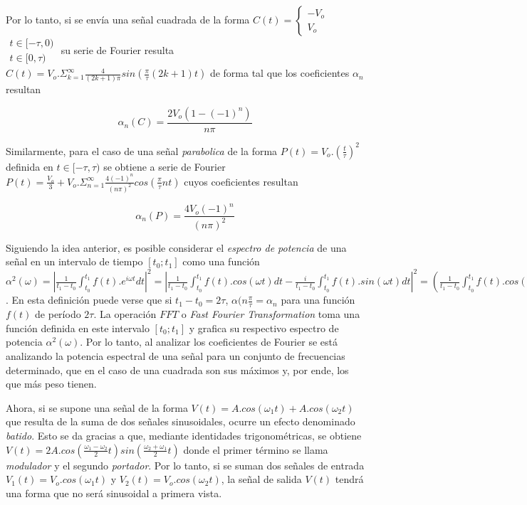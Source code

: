 \documentclass[11pt,a4paper]{article}
\begin{document}
Por lo tanto, si se envía una señal cuadrada de la forma $C(t)=
\left\{\begin{matrix}
-V_o \\ V_o
\end{matrix}\right.$
$\begin{matrix}
t\in[-\tau,0)\\ t\in[0,\tau)
\end{matrix}$
su serie de Fourier resulta $C(t) = V_o.\Sigma_{k=1}^{\infty} \frac{4}{(2k+1)\pi}sin(\frac{\pi}{\tau}(2k+1)t)$ de forma tal que los coeficientes $\alpha_n$ resultan

\begin{equation}
\alpha_n(C) = \frac{2V_o(1-(-1)^n)}{n\pi}
\label{eq:coef_cuad}
\end{equation}

Similarmente, para el caso de una señal \textit{parabolica} de la forma $P(t)=V_o.(\frac{t}{\tau})^2$ definida en $t\in[-\tau,\tau)$ se obtiene a serie de Fourier $P(t) = \frac{V_o}{3} + V_o.\Sigma_{n=1}^{\infty} \frac{4(-1)^n}{(n\pi)^2}cos(\frac{\pi}{\tau}nt)$ cuyos coeficientes resultan

\begin{equation}
\alpha_n(P) = \frac{4V_o(-1)^n}{(n\pi)^2}
\label{eq:coef_parab}
\end{equation}

Siguiendo la idea anterior, es posible considerar el \textit{espectro de potencia} de una señal en un intervalo de tiempo $[t_0;t_1]$ como una función $\alpha^2(\omega) = |\frac{1}{t_1-t_0}\int_{t_0}^{t_1} f(t).e^{i\omega t}dt|^2= |\frac{1}{t_1-t_0}\int_{t_0}^{t_1} f(t).cos(\omega t)dt - \frac{i}{t_1-t_0}\int_{t_0}^{t_1} f(t).sin(\omega t)dt|^2 = (\frac{1}{t_1-t_0}\int_{t_0}^{t_1} f(t).cos(\omega t)dt)^2+(\frac{1}{t_1-t_0}\int_{t_0}^{t_1} f(t).sin(\omega t)dt)^2$. En esta definición puede verse que si $t_1-t_0=2\tau$, $\alpha(n\frac{\pi}{\tau} = \alpha_n$ para una función $f(t)$ de período $2\tau$. La operación $FFT$ o \textit{Fast Fourier Transformation} toma una función definida en este intervalo $[t_0;t_1]$ y grafica su respectivo espectro de potencia $\alpha^2(\omega)$. Por lo tanto, al analizar los coeficientes de Fourier se está analizando la potencia espectral de una señal para un conjunto de frecuencias determinado, que en el caso de una cuadrada son sus máximos y, por ende, los que más peso tienen. 


Ahora, si se supone una señal de la forma $V(t) = A.cos(\omega_1t) + A.cos(\omega_2t)$ que resulta de la suma de dos señales sinusoidales, ocurre un efecto denominado \textit{batido}. Esto se da gracias a que, mediante identidades trigonométricas, se obtiene $V(t) = 2A.cos(\frac{\omega_1-\omega_2}{2}t)sin(\frac{\omega_2+\omega_1}{2}t)$ donde el primer término se llama \textit{modulador} y el segundo \textit{portador}. Por lo tanto, si se suman dos señales de entrada 
$V_1(t) = V_o.cos(\omega_1t)$ y $V_2(t) = V_o.cos(\omega_2t)$, la señal de salida $V(t)$ tendrá una forma que no será sinusoidal a primera vista. 
\end{document}
